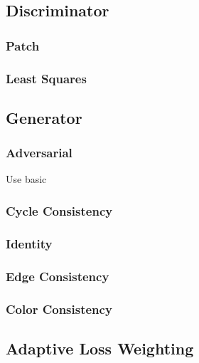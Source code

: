 \documentclass[twoside,english,notitlepage]{report}
\begin{document}
\subsection{Discriminator}
\subsubsection{Patch}

\subsubsection{Least Squares}

\subsection{Generator}

\subsubsection{Adversarial}
Use basic 

\subsubsection{Cycle Consistency}

\subsubsection{Identity}

\subsubsection{Edge Consistency}

\subsubsection{Color Consistency}

\subsection{Adaptive Loss Weighting}








\end{document}
